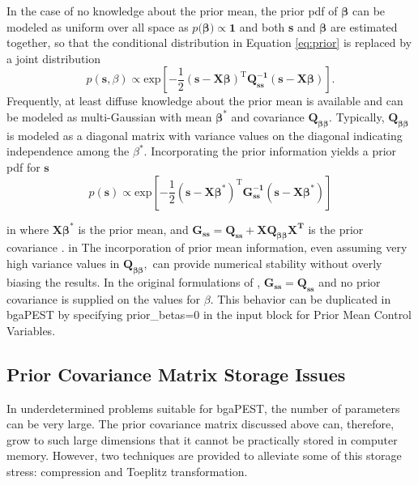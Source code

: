 \documentclass[11pt,oneside,onecolumn]{usgsreport}
\begin{document}
\begin{appendix}
In the case of no knowledge about the prior mean, the prior pdf of
$\mathbf{\beta}$ can be modeled as uniform over all space as $p(\mathbf{\beta)\propto1}$
and both \textbf{s} and $\mathbf{\beta}$ are estimated together,
so that the conditional distribution in Equation \ref{eq:prior} is
replaced by a joint distribution
\[
p(\mathbf{s},\beta)\propto\mathrm{exp\left[\mathbf{-}\frac{1}{2}(\mathbf{s-X\beta})^{T}\mathbf{Q_{ss}^{-1}}(\mathbf{s-X\beta})\right]}.
\]
 Frequently, at least diffuse knowledge about the prior mean is available
and can be modeled as multi-Gaussian with mean $\mathbf{\beta^{*}}$
and covariance $\mathbf{Q_{\beta\beta}}$. Typically, $\mathbf{Q_{\beta\beta}}$
is modeled as a diagonal matrix with variance values on the diagonal
indicating independence among the $\beta^{*}$. Incorporating the
prior information yields a prior pdf for $\mathbf{s}$
\begin{equation}
p(\mathbf{s})\propto\mathrm{exp\left[\mathbf{-}\frac{1}{2}(\mathbf{s-X\beta}^{*})^{T}\mathbf{G_{\mathbf{ss}}^{-1}}(\mathbf{s-X\beta^{*}})\right]}\label{eq:final_prior}
\end{equation}

 in
where $\mathbf{X\beta^{*}}$ is the prior mean, and $\mathbf{G_{ss}=Q_{ss}+XQ_{\beta\beta}X^{\mathbf{T}}}$
is the prior covariance \citep{NowakCirpka2004}.
 in
The incorporation of prior mean information, even assuming very high
variance values in $\mathbf{Q_{\beta\beta},}$ can provide numerical
stability without overly biasing the results. In the original formulations
of \citet{KitanidisVomvoris1983,HoeksemaKitanidis1984a,Kitanidis1995},
$\mathbf{G_{ss}}=\mathbf{Q_{ss}}$ and no prior covariance is supplied
on the values for $\beta.$ This behavior can be duplicated in bgaPEST
by specifying prior\_betas=0 in the input block for Prior Mean Control
Variables.


\subsection{Prior Covariance Matrix Storage Issues}

In underdetermined problems suitable for bgaPEST, the number of parameters
can be very large. The prior covariance matrix discussed above can,
therefore, grow to such large dimensions that it cannot be practically
stored in computer memory. However, two techniques are provided to
alleviate some of this storage stress: compression and Toeplitz transformation.


\end{appendix}
\end{document}
